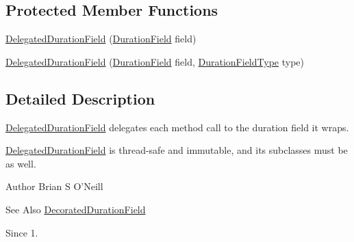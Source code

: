 \subsection*{Protected Member Functions}
\begin{DoxyCompactItemize}
\item 
\hyperlink{classorg_1_1joda_1_1time_1_1field_1_1_delegated_duration_field_ae79dfac023b17de417bf5ab190952468}{Delegated\-Duration\-Field} (\hyperlink{classorg_1_1joda_1_1time_1_1_duration_field}{Duration\-Field} field)
\item 
\hyperlink{classorg_1_1joda_1_1time_1_1field_1_1_delegated_duration_field_a0224470de95350eacf46972111987d0a}{Delegated\-Duration\-Field} (\hyperlink{classorg_1_1joda_1_1time_1_1_duration_field}{Duration\-Field} field, \hyperlink{classorg_1_1joda_1_1time_1_1_duration_field_type}{Duration\-Field\-Type} type)
\end{DoxyCompactItemize}


\subsection{Detailed Description}
{\ttfamily \hyperlink{classorg_1_1joda_1_1time_1_1field_1_1_delegated_duration_field}{Delegated\-Duration\-Field}} delegates each method call to the duration field it wraps. 

\hyperlink{classorg_1_1joda_1_1time_1_1field_1_1_delegated_duration_field}{Delegated\-Duration\-Field} is thread-\/safe and immutable, and its subclasses must be as well.

\begin{DoxyAuthor}{Author}
Brian S O'Neill 
\end{DoxyAuthor}
\begin{DoxySeeAlso}{See Also}
\hyperlink{classorg_1_1joda_1_1time_1_1field_1_1_decorated_duration_field}{Decorated\-Duration\-Field} 
\end{DoxySeeAlso}
\begin{DoxySince}{Since}
1. 
\end{DoxySince}


